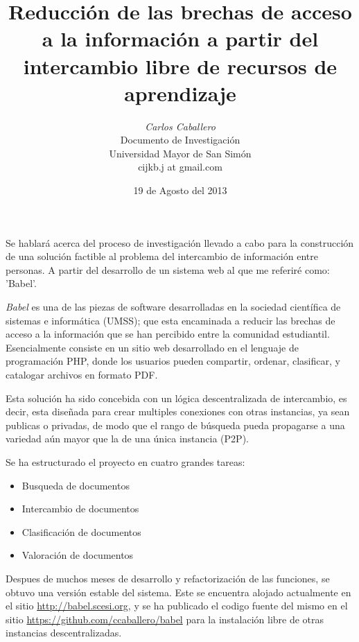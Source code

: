 \documentclass[letter,11pt,twoside,spanish]{article}
\title{Reducción de las brechas de acceso a la información a partir del
intercambio libre de recursos de aprendizaje}
\date{19 de Agosto del 2013}
\author{\emph{Carlos Caballero}\\
Documento de Investigación\\
Universidad Mayor de San Simón\\
cijkb.j at gmail.com\\}
\begin{document}
\begin{multicols}{2}
\maketitle
\pagestyle{empty}
Se hablará acerca del proceso de investigación llevado a cabo para la
construcción de una solución factible al problema del intercambio de
información entre personas. A partir del desarrollo de un sistema web
al que me referiré como: 'Babel'.

\emph{Babel} es una de las piezas de software desarrolladas en la sociedad científica
de sistemas e informática (UMSS); que esta encaminada a reducir las brechas de
acceso a la información que se han percibido entre la comunidad estudiantil.
Esencialmente consiste en un sitio web desarrollado en el lenguaje de
programación PHP, donde los usuarios pueden compartir, ordenar, clasificar, y
catalogar archivos en formato PDF.

Esta solución ha sido concebida con un lógica descentralizada de intercambio, es
decir, esta diseñada para crear multiples conexiones con otras instancias, ya
sean publicas o privadas, de modo que el rango de búsqueda pueda propagarse a
una variedad aún mayor que la de una única instancia (P2P).

Se ha estructurado el proyecto en cuatro grandes tareas:

\begin{itemize}
\item Busqueda de documentos
\item Intercambio de documentos
\item Clasificación de documentos
\item Valoración de documentos
\end{itemize}

Despues de muchos meses de desarrollo y refactorización de las funciones, se
obtuvo una versión estable del sistema. Este se encuentra alojado actualmente
en el sitio \url{http://babel.scesi.org}, y se ha publicado el codigo fuente del
mismo en el sitio \url{https://github.com/ccaballero/babel} para la instalación
libre de otras instancias descentralizadas.
\end{multicols}
\end{document}
